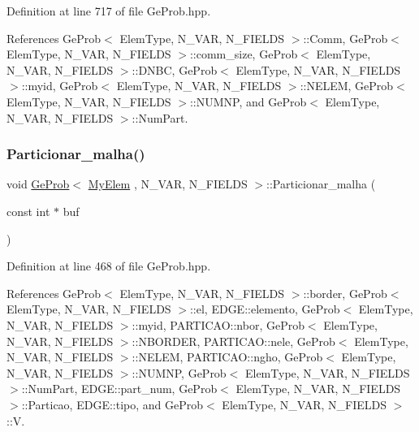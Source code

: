 Definition at line 717 of file Ge\+Prob.\+hpp.



References Ge\+Prob$<$ Elem\+Type, N\+\_\+\+V\+A\+R, N\+\_\+\+F\+I\+E\+L\+D\+S $>$\+::\+Comm, Ge\+Prob$<$ Elem\+Type, N\+\_\+\+V\+A\+R, N\+\_\+\+F\+I\+E\+L\+D\+S $>$\+::comm\+\_\+size, Ge\+Prob$<$ Elem\+Type, N\+\_\+\+V\+A\+R, N\+\_\+\+F\+I\+E\+L\+D\+S $>$\+::\+D\+N\+BC, Ge\+Prob$<$ Elem\+Type, N\+\_\+\+V\+A\+R, N\+\_\+\+F\+I\+E\+L\+D\+S $>$\+::myid, Ge\+Prob$<$ Elem\+Type, N\+\_\+\+V\+A\+R, N\+\_\+\+F\+I\+E\+L\+D\+S $>$\+::\+N\+E\+L\+EM, Ge\+Prob$<$ Elem\+Type, N\+\_\+\+V\+A\+R, N\+\_\+\+F\+I\+E\+L\+D\+S $>$\+::\+N\+U\+M\+NP, and Ge\+Prob$<$ Elem\+Type, N\+\_\+\+V\+A\+R, N\+\_\+\+F\+I\+E\+L\+D\+S $>$\+::\+Num\+Part.

\mbox{\label{classGeProb_ac439ec4e4198924d385d8948edb20708}} 
\subsubsection{\texorpdfstring{Particionar\+\_\+malha()}{Particionar\_malha()}}
{\footnotesize\ttfamily void \hyperlink{classGeProb}{Ge\+Prob}$<$ \hyperlink{DG__Prob_8h_a83cd887ced9a6587428f267e50cd4787}{My\+Elem} , N\+\_\+\+V\+AR, N\+\_\+\+F\+I\+E\+L\+DS $>$\+::Particionar\+\_\+malha (\begin{DoxyParamCaption}\item[{const int $\ast$}]{buf }\end{DoxyParamCaption})\hspace{0.3cm}{\ttfamily [inherited]}}



Definition at line 468 of file Ge\+Prob.\+hpp.



References Ge\+Prob$<$ Elem\+Type, N\+\_\+\+V\+A\+R, N\+\_\+\+F\+I\+E\+L\+D\+S $>$\+::border, Ge\+Prob$<$ Elem\+Type, N\+\_\+\+V\+A\+R, N\+\_\+\+F\+I\+E\+L\+D\+S $>$\+::el, E\+D\+G\+E\+::elemento, Ge\+Prob$<$ Elem\+Type, N\+\_\+\+V\+A\+R, N\+\_\+\+F\+I\+E\+L\+D\+S $>$\+::myid, P\+A\+R\+T\+I\+C\+A\+O\+::nbor, Ge\+Prob$<$ Elem\+Type, N\+\_\+\+V\+A\+R, N\+\_\+\+F\+I\+E\+L\+D\+S $>$\+::\+N\+B\+O\+R\+D\+ER, P\+A\+R\+T\+I\+C\+A\+O\+::nele, Ge\+Prob$<$ Elem\+Type, N\+\_\+\+V\+A\+R, N\+\_\+\+F\+I\+E\+L\+D\+S $>$\+::\+N\+E\+L\+EM, P\+A\+R\+T\+I\+C\+A\+O\+::ngho, Ge\+Prob$<$ Elem\+Type, N\+\_\+\+V\+A\+R, N\+\_\+\+F\+I\+E\+L\+D\+S $>$\+::\+N\+U\+M\+NP, Ge\+Prob$<$ Elem\+Type, N\+\_\+\+V\+A\+R, N\+\_\+\+F\+I\+E\+L\+D\+S $>$\+::\+Num\+Part, E\+D\+G\+E\+::part\+\_\+num, Ge\+Prob$<$ Elem\+Type, N\+\_\+\+V\+A\+R, N\+\_\+\+F\+I\+E\+L\+D\+S $>$\+::\+Particao, E\+D\+G\+E\+::tipo, and Ge\+Prob$<$ Elem\+Type, N\+\_\+\+V\+A\+R, N\+\_\+\+F\+I\+E\+L\+D\+S $>$\+::V.

